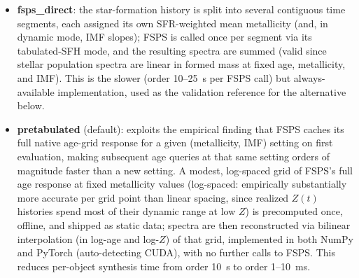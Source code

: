 \documentclass{aastex7}
\begin{document}
\begin{itemize}
    \item \textbf{fsps\_direct}: the star-formation history is split into
    several contiguous time segments, each assigned its own
    SFR-weighted mean metallicity (and, in dynamic mode, IMF slopes); FSPS
    is called once per segment via its tabulated-SFH mode, and the
    resulting spectra are summed (valid since stellar population spectra
    are linear in formed mass at fixed age, metallicity, and IMF). This is
    the slower (order 10--25~s per FSPS call) but always-available
    implementation, used as the validation reference for the alternative
    below.
    \item \textbf{pretabulated} (default): exploits the empirical finding
    that FSPS caches its full native age-grid response for a given
    (metallicity, IMF) setting on first evaluation, making subsequent
    age queries at that same setting orders of magnitude faster than a new
    setting. A modest, log-spaced grid of FSPS's full age response at
    fixed metallicity values (log-spaced: empirically substantially more
    accurate per grid point than linear spacing, since realized $Z(t)$
    histories spend most of their dynamic range at low $Z$) is
    precomputed once, offline, and shipped as static data; spectra are
    then reconstructed via bilinear interpolation (in log-age and log-$Z$)
    of that grid, implemented in both NumPy and PyTorch (auto-detecting
    CUDA), with no further calls to FSPS. This reduces per-object synthesis
    time from order 10~s to order 1--10~ms.
\end{itemize}
\end{document}
